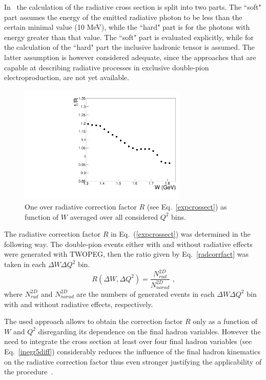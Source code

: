\documentclass[prc,twocolumn,superscriptaddress,showpacs,amssymb,amsmath,amsfonts,linenumbers,aps]{revtex4-1}
\begin{document}
In~\cite{Mo:1968cg,Skorodum:EG} the calculation of the radiative cross section is split into two parts. The ``soft" part assumes the energy of the  emitted radiative photon to be less than the certain minimal value (10 MeV), while the ``hard" part is for the photons with energy greater than that value. 
The ``soft" part is evaluated
explicitly, while for the calculation of the ``hard" part the inclusive hadronic
tensor is assumed. 
The latter assumption is however considered adequate, since the approaches
that are capable at describing radiative processes
in exclusive double-pion electroproduction, are not yet available.

\begin{figure}[htp]
\begin{center}
\includegraphics[width=8cm]{pictures/rad_corr/rad_corr_avrg.pdf}
\caption{\small One over radiative correction factor $R$ (see Eq.~\ref{expcrossect})
as function of $W$ averaged over all considered $Q^{2}$ bins.} \label{radcorrfact}
\end{center}
\end{figure}


The radiative
correction factor $R$ in Eq.~(\ref{expcrossect})
was determined in the following way.
The double-pion events either with and without radiative effects were generated with TWOPEG, then the ratio given by Eq.~\eqref{radcorrfact} was taken in each $\Delta W \Delta Q^{2}$ bin. 
\begin{equation}
\label{radcorrfact}
R(\Delta W,\Delta Q^{2}) = \frac{N_{rad}^{2D}}{N_{norad}^{2D}} \textrm{ ,}
\end{equation}
where $N_{rad}^{2D}$ and $N_{norad}^{2D}$ are the
numbers of generated events in each $\Delta W \Delta Q^{2}$ bin
with and without radiative effects, respectively.



The used approach allows to obtain the correction factor $R$ only as a function of $W$ and $Q^{2}$ disregarding its dependence on the final hadron variables.
However 
the need to integrate the cross section at least over four final hadron variables (see Eq.~\eqref{inegr5diff}) considerably reduces the influence of
the final hadron kinematics on the
radiative correction factor thus even stronger justifying 
the applicability of the procedure~\cite{Mo:1968cg,Skorodum:EG}.
\end{document}
